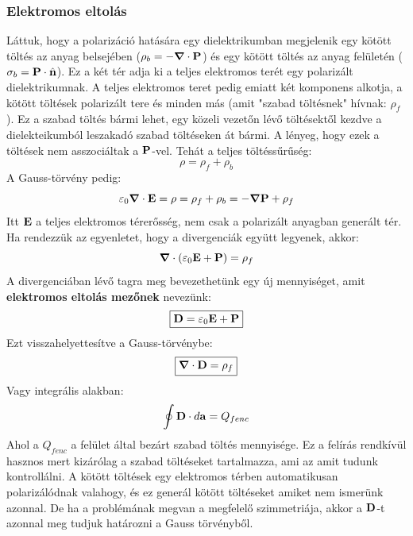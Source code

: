 \documentclass[a4paper,12pt]{article}
\begin{document}
\subsubsection{Elektromos eltolás}
Láttuk, hogy a polarizáció hatására egy dielektrikumban megjelenik egy kötött töltés az anyag belsejében ($\rho_b = - \boldsymbol{\nabla} \cdot \bold{P}$) és egy kötött töltés az anyag
felületén ($\sigma_b = \bold{P} \cdot \hat{\bold{n}}$). Ez a két tér adja ki a teljes elektromos terét egy polarizált dielektrikumnak. A teljes elektromos teret pedig emiatt két komponens
alkotja, a kötött töltések polarizált tere és minden más (amit "szabad töltésnek" hívnak: $\rho_f$). Ez a szabad töltés bármi lehet, egy közeli vezetőn lévő töltésektől kezdve a dielekteikumból leszakadó szabad töltéseken át bármi.
A lényeg, hogy ezek a töltések nem asszociáltak a $\bold{P}$-vel. Tehát a teljes töltéssűrűség:
\begin{equation}
    \rho = \rho_f + \rho_b
\end{equation}
A Gauss-törvény pedig:
\begin{equation}
    \varepsilon_0 \boldsymbol{\nabla} \cdot \bold{E} = \rho = \rho_f + \rho_b = - \boldsymbol{\nabla} \bold{P} + \rho_f
\end{equation} 
Itt $\bold{E}$ a teljes elektromos térerősség, nem csak a polarizált anyagban generált tér. Ha rendezzük az egyenletet, hogy a divergenciák együtt legyenek, akkor:
\begin{equation}
    \boldsymbol{\nabla} \cdot (\varepsilon_0 \bold{E} + \bold{P}) = \rho_f
\end{equation}
A divergenciában lévő tagra meg bevezethetünk egy új mennyiséget, amit \textbf{elektromos eltolás mezőnek} nevezünk:
\begin{equation}
    \boxed{\bold{D} = \varepsilon_0 \bold{E} + \bold{P}}
\end{equation}
Ezt visszahelyettesítve a Gauss-törvénybe:
\begin{equation}
    \boxed{\boldsymbol{\nabla} \cdot \bold{D} = \rho_f}
\end{equation}
Vagy integrális alakban:
\begin{equation}
    \oint \bold{D} \cdot d\bold{a} = Q_{fenc}
\end{equation}
Ahol a $Q_{fenc}$ a felület által bezárt szabad töltés mennyisége. Ez a felírás rendkívül hasznos mert kizárólag a szabad töltéseket tartalmazza, ami az amit tudunk kontrollálni.
A kötött töltések egy elektromos térben automatikusan polarizálódnak valahogy, és ez generál kötött töltéseket amiket nem ismerünk azonnal. De ha a problémának megvan a megfelelő szimmetriája,
akkor a $\bold{D}$-t azonnal meg tudjuk határozni a Gauss törvényből.
\end{document}
